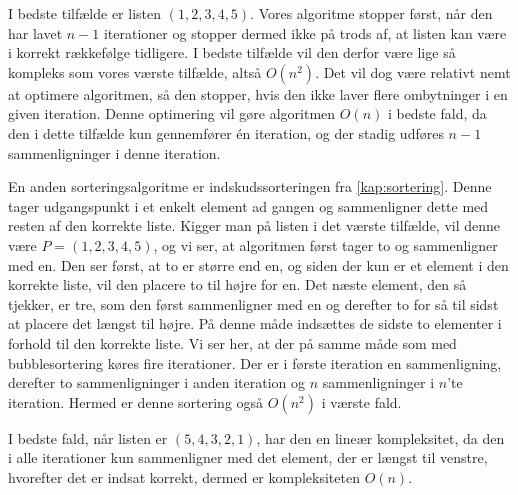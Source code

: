 I bedste tilfælde er listen $(1, 2, 3, 4, 5)$.
Vores algoritme stopper først, når den har lavet $n-1$ iterationer og stopper dermed ikke på trods af, at listen kan være i korrekt rækkefølge tidligere. I bedste tilfælde vil den derfor være lige så kompleks som vores værste tilfælde, altså $O(n^2)$. Det vil dog være relativt nemt at optimere algoritmen, så den stopper, hvis den ikke laver flere ombytninger i en given iteration. Denne optimering vil gøre algoritmen $O(n)$ i bedste fald, da den i dette tilfælde kun gennemfører én iteration, og der stadig udføres $n-1$ sammenligninger i denne iteration. 

En anden sorteringsalgoritme er indskudssorteringen fra \autoref{kap:sortering}. Denne tager udgangspunkt i et enkelt element ad gangen og sammenligner dette med resten af den korrekte liste.
Kigger man på listen i det værste tilfælde, vil denne være $P=(1,2,3,4,5)$, og vi ser, at algoritmen først tager to og sammenligner med en. Den ser først, at to er større end en, og siden der kun er et element i den korrekte liste, vil den placere to til højre for en. Det næste element, den så tjekker, er tre, som den først sammenligner med en og derefter to for så til sidst at placere det længst til højre. På denne måde indsættes de sidste to elementer i forhold til den korrekte liste.
Vi ser her, at der på samme måde som med bubblesortering køres fire iterationer. Der er i første iteration en sammenligning, derefter to sammenligninger i anden iteration og $n$ sammenligninger i $n$'te iteration. Hermed er denne sortering også $O(n^2)$ i værste fald.


I bedste fald, når listen er $(5,4,3,2,1)$, har den en lineær kompleksitet, da den i alle iterationer kun sammenligner med det element, der er længst til venstre, hvorefter det er indsat korrekt, dermed er kompleksiteten $O(n)$.





